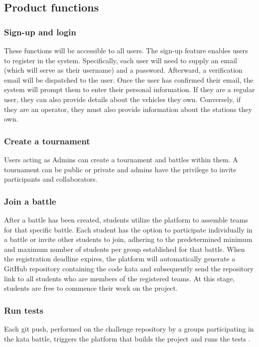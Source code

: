 \documentclass{article}
\newcommand{\group}{groups }
\begin{document}
           
        \subsection{Product functions}        
            \subsubsection{Sign-up and login}
                These functions will be accessible to all users. The sign-up feature enables users to register in the system. Specifically, each user will need to supply an email (which will serve as their username) and a password. Afterward, a verification email will be dispatched to the user. Once the user has confirmed their email, the system will prompt them to enter their personal information. If they are a regular user, they can also provide details about the vehicles they own. Conversely, if they are an operator, they must also provide information about the stations they own.
            \subsubsection{Create a tournament}
                Users acting as Admins can create a tournament and battles within them. A tournament can be public or private and admins have the privilege to invite participants and collaborators.
            
        \subsubsection{Join a battle}
            After a battle has been created, students utilize the platform to assemble teams for that specific battle. Each student has the option to participate individually in a battle or invite other students to join, adhering to the predetermined minimum and maximum number of students per group established for that battle. When the registration deadline expires, the platform will automatically generate a GitHub repository containing the code kata and subsequently send the repository link to all students who are members of the registered teams. At this stage, students are free to commence their work on the project.

        
            \subsubsection{Run tests}
                Each git push, performed on the challenge repository by a \group participating in the kata battle, triggers the platform that builds the project and runs the tests .
\end{document}
